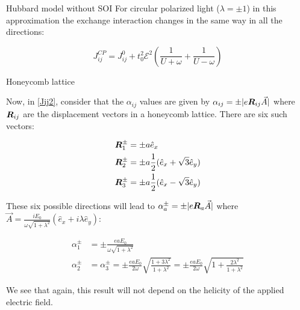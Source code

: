 \begin{section}{Hubbard model without SOI}
For circular polarized light ($\lambda=\pm1$) in this approximation the exchange interaction changes in the same way in all the directions:

\begin{equation}
J_{ij}^{CP} = J_{ij}^0 + t_0^2 \mathcal{E}^2 \left( \frac{1}{U+\omega} + \frac{1}{U-\omega} \right)
\end{equation}

\begin{subsection}{Honeycomb lattice}

Now, in \ref{Jij2}, consider that the $\alpha_{ij}$ values are given by $\alpha_{ij} = \pm|e\boldsymbol{R}_{ij}\vec{A}|$ where $\boldsymbol{R}_{ij}$ are the displacement vectors in a honeycomb lattice. There are six such vectors:

\begin{align}
\boldsymbol{R}_1^\pm &= \pm a\hat{e}_x \\
\boldsymbol{R}_2^\pm &= \pm a\frac{1}{2}(\hat{e}_x + \sqrt{3}\hat{e}_y) \\
\boldsymbol{R}_3^\pm &= \pm a\frac{1}{2}(\hat{e}_x - \sqrt{3}\hat{e}_y)
\end{align}

These six possible directions will lead to $\alpha_a^\pm = \pm |e\boldsymbol{R}_a\vec{A}|$ where $\vec{A}=\frac{iE_0}{\omega\sqrt{1+\lambda^2}}(\hat{e}_x+i\lambda\hat{e}_y)$:

\begin{align}
\alpha_1^\pm &= \pm \frac{eaE_0}{\omega\sqrt{1+\lambda^2}} \\
\alpha_2^\pm &= \alpha_3^\pm = \pm \frac{eaE_0}{2\omega} \sqrt{\frac{1+3\lambda^2}{1+\lambda^2}} = \pm\frac{eaE_0}{2\omega}\sqrt{1+\frac{2\lambda^2}{1+\lambda^2}}
\end{align}

We see that again, this result will not depend on the helicity of the applied electric field.

\end{subsection}

\end{section}

